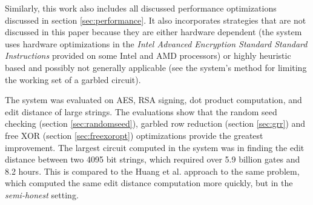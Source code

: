 Similarly, this work also includes all discussed performance optimizations discussed in section \ref{sec:performance}. It also incorporates strategies that are not discussed in this paper because they are either hardware dependent (the system uses hardware optimizations in the \emph{Intel Advanced Encryption Standard Standard Instructions} provided on some Intel and AMD processors) or highly heuristic based and possibly not generally applicable (see the system's method for limiting the working set of a garbled circuit).

The system was evaluated on AES, RSA signing, dot product computation, and edit distance of large strings.  The evaluations show that the random seed checking (section \ref{sec:randomseed}), garbled row reduction (section \ref{sec:grr}) and free XOR (section \ref{sec:freexoropt}) optimizations provide the greatest improvement.  The largest circuit computed in the system was in finding the edit distance between two 4095 bit strings, which required over 5.9 billion gates and 8.2 hours.  This is compared to the Huang et al. approach to the same problem, which computed the same edit distance computation more quickly, but in the \emph{semi-honest} setting.
